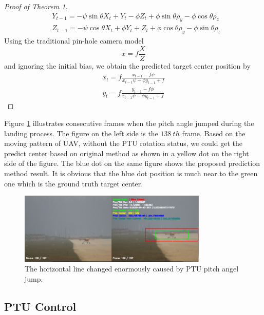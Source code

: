 \documentclass[journal,article,submit,moreauthors,pdftex,10pt,a4paper]{mdpi}
\begin{document}
\begin{proof}[Proof of Theorem 1]
\begin{align}
&Y_{t-1} = -\psi \sin \theta X_t +  Y_ t - \phi Z_t + \phi \sin \theta \rho_y - \phi \cos \theta \rho_z \\
&Z_{t-1}  = -\psi \cos \theta X_t + \phi  Y_ t + Z_t + \phi \cos \theta \rho_y - \phi \sin \theta \rho_z
\end{align}
Using the traditional pin-hole camera model
\begin{equation}
x = f \frac{X}{Z}
\end{equation}
and ignoring the initial bias, we obtain the predicted target center position by
\begin{align}
\label{eq:prev_predict_curr}
x_{t} = f\frac{x_{t-1} - f\psi }{x_{t-1}  \psi  - \phi y_{t-1} + f} \\
y_{t} = f\frac{y_{t-1} -f\phi}{  x_{t-1} \psi - \phi y_{t-1} + f}
\end{align}
\end{proof}

Figure \ref{fig:chp04_17_predict_1} illustrates consecutive frames when the pitch angle jumped during the landing process. The figure on the left side is the $138\ th$ frame. Based on the moving pattern of UAV, without the PTU rotation status, we could get the predict center based on original method as shown in a yellow dot on the right side of the figure. The blue dot on the same figure shows the proposed prediction method result. It is obvious that the blue dot position is much near to the green one which is the ground truth target center.

\begin{figure}[!th]
	\centering
	\includegraphics[width=0.8\textwidth]{Figs/chp04_17_predict_1.pdf}
	\caption{The horizontal line changed enormously caused by PTU pitch angel jump. }
	\label{fig:chp04_17_predict_1}    
\end{figure}


\subsection{PTU Control}
\end{document}

